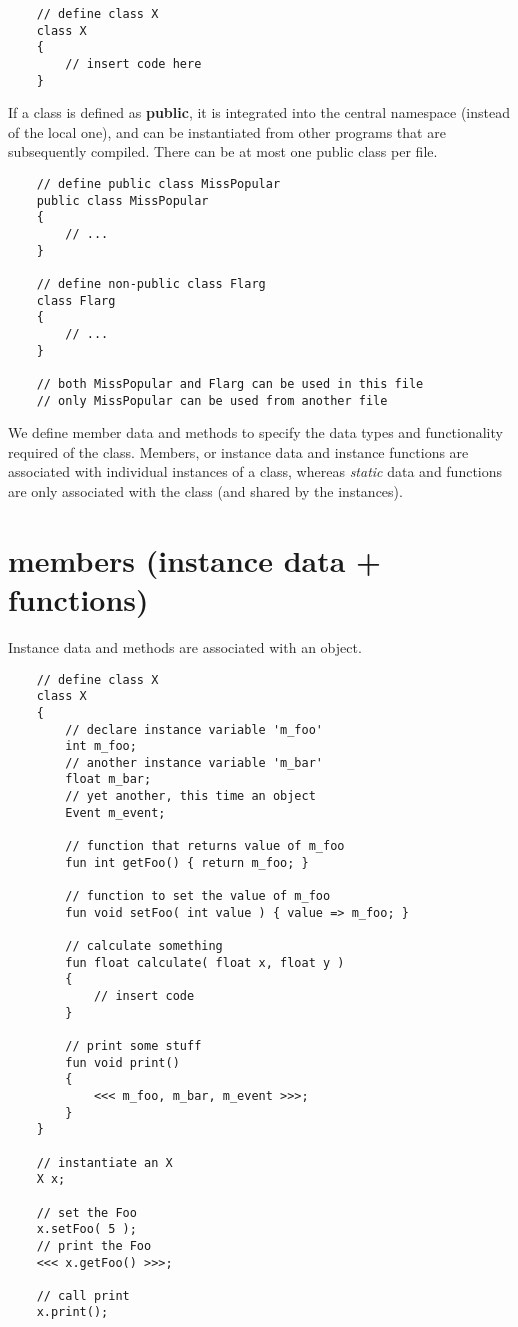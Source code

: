 \begin{verbatim}
    // define class X
    class X
    {
        // insert code here
    }
\end{verbatim}

If a class is defined as {\bf public}, it is integrated into the central namespace (instead of the local one), and can be instantiated from other programs that are subsequently compiled. There can be at most one public class per file.

\begin{verbatim}
    // define public class MissPopular
    public class MissPopular
    {
        // ...
    }

    // define non-public class Flarg
    class Flarg
    {
        // ...
    }

    // both MissPopular and Flarg can be used in this file
    // only MissPopular can be used from another file
\end{verbatim}

We define member data and methods to specify the data types and functionality required of the class. Members, or instance data and instance functions are associated with individual instances of a class, whereas {\it static} data and functions are only associated with the class (and shared by the instances).

\section{members (instance data + functions)}

Instance data and methods are associated with an object.

\begin{verbatim}
    // define class X
    class X
    {
        // declare instance variable 'm_foo'
        int m_foo;
        // another instance variable 'm_bar'
        float m_bar;
        // yet another, this time an object
        Event m_event;

        // function that returns value of m_foo
        fun int getFoo() { return m_foo; }

        // function to set the value of m_foo
        fun void setFoo( int value ) { value => m_foo; }

        // calculate something
        fun float calculate( float x, float y )
        {
            // insert code
        }

        // print some stuff
        fun void print()
        {
            <<< m_foo, m_bar, m_event >>>;
        }
    }

    // instantiate an X
    X x;

    // set the Foo
    x.setFoo( 5 );
    // print the Foo
    <<< x.getFoo() >>>;

    // call print
    x.print();
\end{verbatim}

